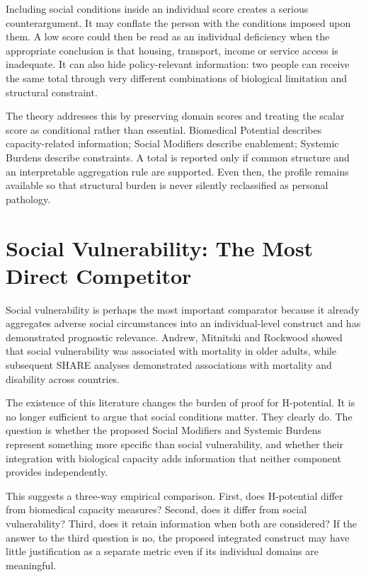 Including social conditions inside an individual score creates a serious
counterargument. It may conflate the person with the conditions imposed upon
them. A low score could then be read as an individual deficiency when the
appropriate conclusion is that housing, transport, income or service access is
inadequate. It can also hide policy-relevant information: two people can receive
the same total through very different combinations of biological limitation and
structural constraint.

The theory addresses this by preserving domain scores and treating the scalar
score as conditional rather than essential. Biomedical Potential describes
capacity-related information; Social Modifiers describe enablement; Systemic
Burdens describe constraints. A total is reported only if common structure and
an interpretable aggregation rule are supported. Even then, the profile remains
available so that structural burden is never silently reclassified as personal
pathology.

\section{Social Vulnerability: The Most Direct Competitor}

Social vulnerability is perhaps the most important comparator because it already aggregates adverse social circumstances into an individual-level construct and has demonstrated prognostic relevance. Andrew, Mitnitski and Rockwood showed that social vulnerability was associated with mortality in older adults, while subsequent SHARE analyses demonstrated associations with mortality and disability across countries. \cite{andrew_social_vulnerability_2008,social_vulnerability_share_2014}

The existence of this literature changes the burden of proof for H-potential. It is no longer sufficient to argue that social conditions matter. They clearly do. The question is whether the proposed Social Modifiers and Systemic Burdens represent something more specific than social vulnerability, and whether their integration with biological capacity adds information that neither component provides independently.

This suggests a three-way empirical comparison. First, does H-potential differ from biomedical capacity measures? Second, does it differ from social vulnerability? Third, does it retain information when both are considered? If the answer to the third question is no, the proposed integrated construct may have little justification as a separate metric even if its individual domains are meaningful.

